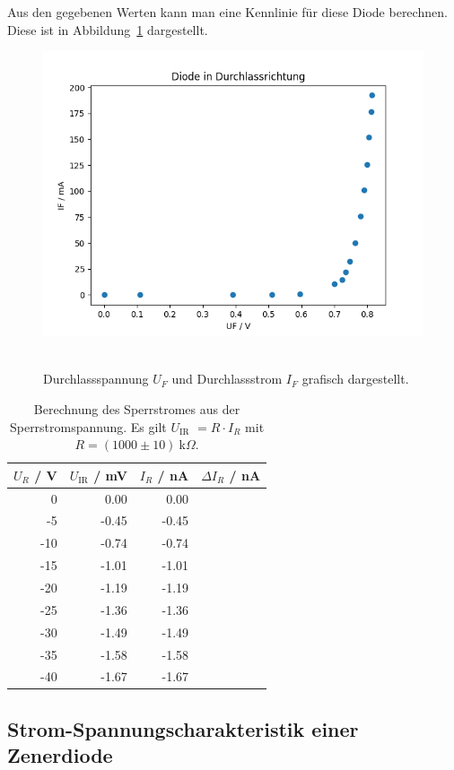 \documentclass{article}
\newcommand{\UIR}{$U_\text{IR}$ }
\begin{document}
Aus den gegebenen Werten kann man eine Kennlinie für diese Diode berechnen. Diese ist in Abbildung~\ref{fig:grafik_task1a} dargestellt. 
\begin{figure}[H]
\caption{Durchlassspannung $U_F$ und Durchlassstrom $I_F$ grafisch dargestellt.}
\label{fig:grafik_task1a}
{\centering
\includegraphics[scale=0.7]{bilder/task1a.png}
~
}
\end{figure}



\begin{table}[H]
\caption{Berechnung des Sperrstromes aus der Sperrstromspannung. Es gilt \UIR $= R\cdot I_R$ mit $R=(1000\pm10)~$k$\Omega$.}
\label{tab:task1b_daten}
\begin{tabular}{rr|rr}
$U_R$ / V & $U_\text{IR}$ / mV& $I_R$ / nA & $\Delta I_R$ / nA \\ \hline
0   &  0.00 & 0.00 \\
-5  & -0.45 & -0.45 \\
-10 & -0.74 & -0.74 \\
-15 & -1.01 & -1.01 \\
-20 & -1.19 & -1.19 \\
-25 & -1.36 & -1.36 \\
-30 & -1.49 & -1.49 \\
-35 & -1.58 & -1.58 \\
-40 & -1.67 & -1.67
\end{tabular}
\end{table}



\subsection{Strom-Spannungscharakteristik einer Zenerdiode}
\end{document}
